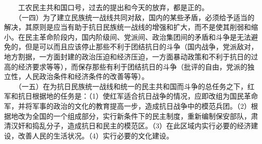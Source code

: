 \documentclass[cn,11pt,chinese]{elegantbook}
\begin{document}
　　工农民主共和国口号，过去的提出和今天的放弃，都是正的。\\
　　（一四）为了建立民族统一战线共同对敌，国内的某些矛盾，必须给予适当的解决，其原则是应当有助于抗日民族统一战线的增强和扩大，而不是使其削弱和缩小。在民主革命阶段内，国内阶级间、党派间、政治集团间的矛盾和斗争是无法避免的，但是可以而且应该停止那些不利于团结抗日的斗争（国内战争，党派敌对，地方割据，一方面封建的政治压迫和经济压迫，一方面暴动政策和不利于抗日的过高的经济要求等等），而保存那些有利于团结抗日的斗争（批评的自由，党派的独立性，人民政治条件和经济条件的改善等等）。\\
　　（一五）在为抗日民族统一战线和统一的民主共和国而斗争的总任务之下，红军和抗日根据地的任务是：（1）使红军适合抗日战争的情况，应即改组为国民革命军，并将军事的政治的文化的教育提高一步，造成抗日战争中的模范兵团。（2）根据地改为全国的一个组成部分，实行新条件下的民主制度，重新编制保安部队，肃清汉奸和捣乱分子，造成抗日和民主的模范区。（3）在此区域内实行必要的经济建设，改善人民的生活状况。（4）实行必要的文化建设。\\
\end{document}

